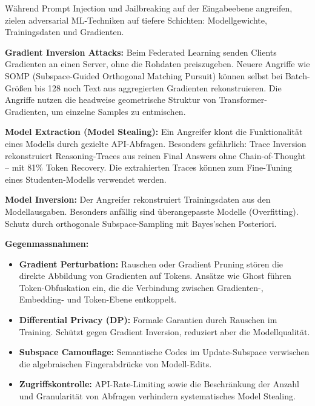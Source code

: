Während Prompt Injection und Jailbreaking auf der Eingabeebene angreifen, zielen adversarial ML-Techniken auf tiefere Schichten: Modellgewichte, Trainingsdaten und Gradienten.

\textbf{Gradient Inversion Attacks:} Beim Federated Learning senden Clients Gradienten an einen Server, ohne die Rohdaten preiszugeben. Neuere Angriffe wie SOMP (Subspace-Guided Orthogonal Matching Pursuit) können selbst bei Batch-Größen bis 128 noch Text aus aggregierten Gradienten rekonstruieren. Die Angriffe nutzen die headweise geometrische Struktur von Transformer-Gradienten, um einzelne Samples zu entmischen.

\textbf{Model Extraction (Model Stealing):} Ein Angreifer klont die Funktionalität eines Modells durch gezielte API-Abfragen. Besonders gefährlich: Trace Inversion rekonstruiert Reasoning-Traces aus reinen Final Answers ohne Chain-of-Thought -- mit 81\% Token Recovery. Die extrahierten Traces können zum Fine-Tuning eines Studenten-Modells verwendet werden.

\textbf{Model Inversion:} Der Angreifer rekonstruiert Trainingsdaten aus den Modellausgaben. Besonders anfällig sind überangepasste Modelle (Overfitting). Schutz durch orthogonale Subspace-Sampling mit Bayes'schen Posteriori.

\textbf{Gegenmassnahmen:}

\begin{itemize}[leftmargin=*]
    \item \textbf{Gradient Perturbation:} Rauschen oder Gradient Pruning stören die direkte Abbildung von Gradienten auf Tokens. Ansätze wie Ghost führen Token-Obfuskation ein, die die Verbindung zwischen Gradienten-, Embedding- und Token-Ebene entkoppelt.
    \item \textbf{Differential Privacy (DP):} Formale Garantien durch Rauschen im Training. Schützt gegen Gradient Inversion, reduziert aber die Modellqualität.
    \item \textbf{Subspace Camouflage:} Semantische Codes im Update-Subspace verwischen die algebraischen Fingerabdrücke von Modell-Edits.
    \item \textbf{Zugriffskontrolle:} API-Rate-Limiting sowie die Beschränkung der Anzahl und Granularität von Abfragen verhindern systematisches Model Stealing.
\end{itemize}


